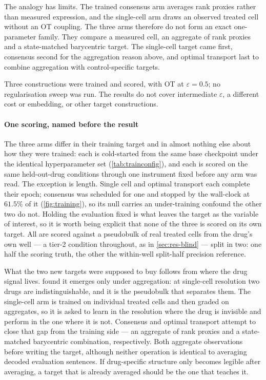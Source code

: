 The analogy has limits. The trained consensus arm averages rank proxies rather
than measured expression, and the single-cell arm draws an observed treated
cell without an OT coupling. The three arms therefore do not form an exact
one-parameter family. They compare a measured cell, an aggregate of rank
proxies and a state-matched barycentric target. The single-cell target came
first, consensus second for the aggregation reason above, and optimal
transport last to combine aggregation with control-specific targets.

Three constructions were trained and scored, with OT at $\varepsilon=0.5$;
no regularisation sweep was run. The results do not cover intermediate
$\varepsilon$, a different cost or embedding, or other target constructions.

\paragraph{One scoring, named before the result} The three arms differ in their
training target and in almost nothing else about how they were trained: each is
cold-started from the same base checkpoint under the identical hyperparameter set
(\cref{tab:trainconfig}), and each is scored on the same held-out-drug conditions
through one instrument fixed before any arm was read. The exception is length.
Single cell and optimal transport each complete their epoch; consensus was
scheduled for one and stopped by the wall-clock at $61.5\%$ of it
(\cref{fig:training}), so its null carries an under-training confound the other
two do not. Holding the evaluation
fixed is what leaves the target as the variable of interest, so it is worth being
explicit that none of the three is scored on its own target. All are scored against a pseudobulk of real treated cells from the drug's own well — a tier-2 condition throughout, as in \cref{sec:res-blind} — split in two: one half the scoring truth, the other the within-well split-half precision reference.



What the two new targets were supposed to buy follows from where the drug signal
lives.  found it emerges only under aggregation: at
single-cell resolution two drugs are indistinguishable, and it is the pseudobulk
that separates them. The single-cell arm is trained on individual treated cells
and then graded on aggregates, so it is asked to learn in the resolution where
the drug is invisible and perform in the one where it is not. Consensus and
optimal transport attempt to close that gap from the training side --- an
aggregate of rank proxies and a state-matched barycentric combination,
respectively. Both aggregate observations before writing the target, although
neither operation is identical to averaging decoded evaluation sentences.
If drug-specific structure only becomes legible after
averaging, a target that is already averaged should be the one that teaches it.

